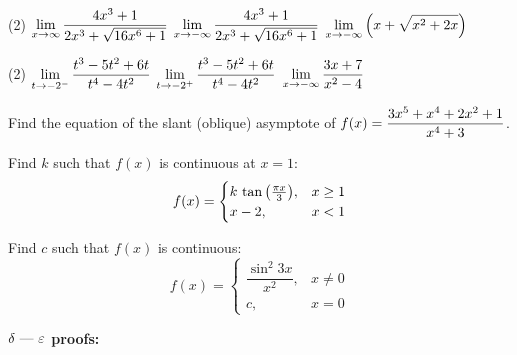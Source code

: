 \documentclass[mathNotesPreamble]{subfiles}
\begin{document}
  \begin{tasks}[label=\hspace*{0pt}, after-item-skip=\stretch{1}](2)
    \task $\displaystyle\lim_{x\to \infty} \frac{4x^3+1}{2x^3+\sqrt{16x^6+1}}$
    \task $\displaystyle\lim_{x\to -\infty} \frac{4x^3+1}{2x^3+\sqrt{16x^6+1}}$
    \task $\displaystyle\lim_{x\to -\infty} {\left(x+\sqrt{x^2+2x}\right)}$
  \end{tasks}
  \pagebreak
  
  \begin{tasks}[label=\hspace*{0pt}, after-item-skip=\stretch{1}](2)
    \task $\displaystyle\lim_{t\to -2^-} \frac{t^3-5t^2+6t}{t^4-4t^2}$
    \task $\displaystyle\lim_{t\to -2^+} \frac{t^3-5t^2+6t}{t^4-4t^2}$
    \task $\displaystyle\lim_{x\to -\infty} \frac{3x+7}{x^2-4}$
  \end{tasks}
  \pagebreak
  
  Find the equation of the slant (oblique) asymptote of $\displaystyle f(x)=\frac{3x^5+x^4+2x^2+1}{x^4+3}$.
  \pagebreak
  
  Find $k$ such that $f(x)$ is continuous at $x=1$:
    $$f(x)=\begin{cases}
      k\,\tan{\left(\frac{\pi x}{3}\right)},& x\geq 1\\
      x-2,& x<1
    \end{cases}$$
  
  Find $c$ such that $f(x)$ is continuous:
    $$f(x)=\begin{cases}
      \dfrac{\sin^2 3x}{x^2},& x\neq 0\\
      c,& x=0
    \end{cases}$$
  \pagebreak 
  
\textbf{$\delta \textnormal{ --- } \varepsilon$ proofs:}
\end{document}
